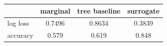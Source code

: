 \begin{tabular}{lccc}
\toprule
 & marginal & tree baseline & surrogate \\
\midrule
log loss & 0.7496 & 0.8634 & 0.3839 \\
accuracy & 0.579 & 0.619 & 0.848 \\
\bottomrule
\end{tabular}
